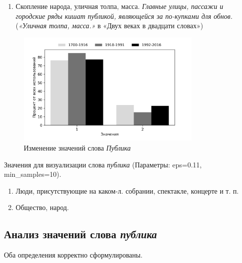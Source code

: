 \begin{enumerate}
    \item Скопление народа, уличная толпа, масса. \textit{Главные улицы, пассажи и городские ряды кишат публикой, являющейся за по-купками для обнов.}
(\textit{«Уличная толпа, масса.»} в «Двух веках в двадцати словах»)

\end{enumerate}

\begin{figure}[H]
	\centering
	\includegraphics[width=0.8\textwidth]{img/visualizations/publika_minimal}
	\caption{Изменение значений слова \textit{Публика}}
	\label{fig:Публика}
\end{figure}

Значения для визуализации слова \textit{публика} (Параметры: eps=0.11, min\_samples=10).

\begin{enumerate}
    \item Люди, присутствующие на каком-л. собрании, спектакле, концерте и т. п.
    \item Общество, народ.
\end{enumerate}

\subsection*{Анализ значений слова \textit{публика}}

Оба определения корректно сформулированы.

